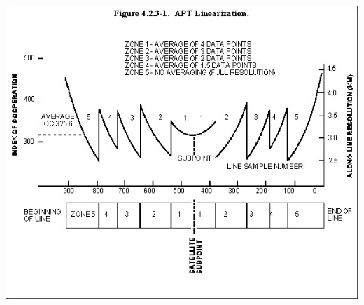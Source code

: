 \documentclass[]{beamer}
\begin{document}
\begin{frame}
    \begin{center}
    \includegraphics[width=0.75\paperwidth,height=1.0\paperheight,keepaspectratio]{images/apt-freq.jpg}
    \end{center}
\end{frame}
\end{document}
